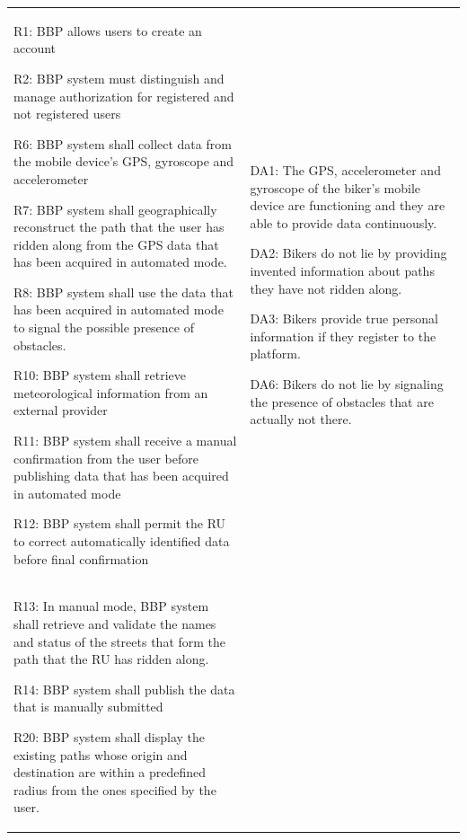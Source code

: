 \documentclass{article}
\begin{document}
\begin{longtable}{|p{}|p{}|}
    R1: BBP allows users to create an account \par
    R2: BBP system must distinguish and manage authorization for registered and not registered users \par
    R6: BBP system shall collect data from the mobile device’s GPS, gyroscope and accelerometer \par
    R7: BBP system shall geographically reconstruct the path that the user has ridden along from the GPS data that has been acquired in automated mode. \par
    R8: BBP system shall use the data that has been acquired in automated mode to signal the possible presence of obstacles. \par
    R10: BBP system shall retrieve meteorological information from an external provider \par
    R11: BBP system shall receive a manual confirmation from the user before publishing data that has been acquired in automated mode \par
    R12: BBP system shall permit the RU to correct automatically identified data before final confirmation 
    & 
    DA1: The GPS, accelerometer and gyroscope of the biker’s mobile device are functioning and they are able to provide data continuously.   \par
    DA2: Bikers do not lie by providing invented information about paths they have not ridden along. \par
    DA3: Bikers provide true personal information if they register to the platform. \par
    DA6: Bikers do not lie by signaling the presence of obstacles that are actually not there. \par
    \\
    R13: In manual mode, BBP system shall retrieve and validate the names and status of the streets that form the path that the RU has ridden along. \par
    R14: BBP system shall publish the data that is manually submitted \par
    R20: BBP system shall display the existing paths whose origin and destination are within a predefined radius from the ones specified by the user.  & 
    \\
    \hline
\end{longtable}
\end{document}
